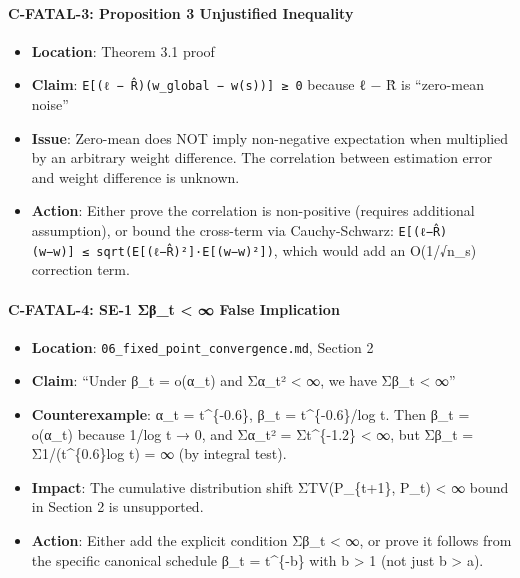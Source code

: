 \documentclass[
  12pt,
]{ctexart}
\providecommand{\tightlist}{%
  \setlength{\itemsep}{0pt}\setlength{\parskip}{0pt}}
\begin{document}
\paragraph{C-FATAL-3: Proposition 3 Unjustified
Inequality}\label{c-fatal-3-proposition-3-unjustified-inequality}

\begin{itemize}
\tightlist
\item
  \textbf{Location}: Theorem 3.1 proof
\item
  \textbf{Claim}: \texttt{E{[}(ℓ\ −\ R̂)(w\_global\ −\ w(s)){]}\ ≥\ 0}
  because ℓ − R̂ is ``zero-mean noise''
\item
  \textbf{Issue}: Zero-mean does NOT imply non-negative expectation when
  multiplied by an arbitrary weight difference. The correlation between
  estimation error and weight difference is unknown.
\item
  \textbf{Action}: Either prove the correlation is non-positive
  (requires additional assumption), or bound the cross-term via
  Cauchy-Schwarz:
  \texttt{\textbar{}E{[}(ℓ−R̂)(w−w\textquotesingle{}){]}\textbar{}\ ≤\ sqrt(E{[}(ℓ−R̂)²{]}·E{[}(w−w\textquotesingle{})²{]})},
  which would add an O(1/√n\_s) correction term.
\end{itemize}

\paragraph{C-FATAL-4: SE-1 Σβ\_t \textless{} ∞ False
Implication}\label{c-fatal-4-se-1-ux3c3ux3b2_t-false-implication}

\begin{itemize}
\tightlist
\item
  \textbf{Location}: \texttt{06\_fixed\_point\_convergence.md}, Section
  2
\item
  \textbf{Claim}: ``Under β\_t = o(α\_t) and Σα\_t² \textless{} ∞, we
  have Σβ\_t \textless{} ∞''
\item
  \textbf{Counterexample}: α\_t = t\^{}\{-0.6\}, β\_t =
  t\^{}\{-0.6\}/log t. Then β\_t = o(α\_t) because 1/log t → 0, and
  Σα\_t² = Σt\^{}\{-1.2\} \textless{} ∞, but Σβ\_t = Σ1/(t\^{}\{0.6\}log
  t) = ∞ (by integral test).
\item
  \textbf{Impact}: The cumulative distribution shift ΣTV(P\_\{t+1\},
  P\_t) \textless{} ∞ bound in Section 2 is unsupported.
\item
  \textbf{Action}: Either add the explicit condition Σβ\_t \textless{}
  ∞, or prove it follows from the specific canonical schedule β\_t =
  t\^{}\{-b\} with b \textgreater{} 1 (not just b \textgreater{} a).
\end{itemize}
\end{document}
